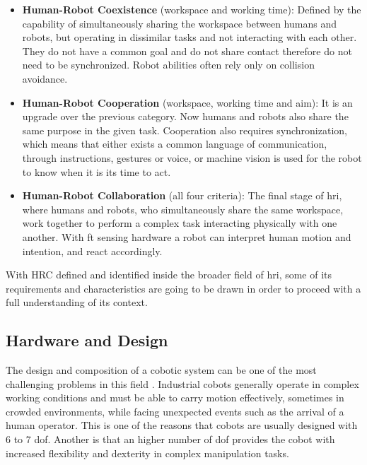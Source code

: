 \begin{itemize}
    \item \textbf{Human-Robot Coexistence} (workspace and working time): Defined by the capability of simultaneously sharing the workspace between humans and robots, but operating in dissimilar tasks and not interacting with each other. They do not have a common goal and do not share contact therefore do not need to be synchronized. Robot abilities often rely only on collision avoidance.
    \item \textbf{Human-Robot Cooperation} (workspace, working time and aim): It is an upgrade over the previous category. Now humans and robots also share the same purpose in the given task. Cooperation also requires synchronization, which means that either exists a common language of communication, through instructions, gestures or voice, or machine vision is used for the robot to know when it is its time to act.
    \item \textbf{Human-Robot Collaboration} (all four criteria): The final stage of \ac{hri}, where humans and robots, who simultaneously share the same workspace, work together to perform a complex task interacting physically with one another. With \ac{ft} sensing hardware a robot can interpret human motion and intention, and react accordingly. 
\end{itemize}


\par With HRC defined and identified inside the broader field of \ac{hri}, some of its requirements and characteristics are going to be drawn in order to proceed with a full understanding of its context.


\subsection{Hardware and Design}

\par The design and composition of a cobotic system can be one of the most challenging problems in this field \cite{handbook, cobot.design}. Industrial cobots generally operate in complex working conditions and must be able to carry motion effectively, sometimes in crowded environments, while facing unexpected events such as the arrival of a human operator. This is one of the reasons that cobots are usually designed with 6 to 7 \ac{dof}. Another is that an higher number of \ac{dof} provides the cobot with increased flexibility and dexterity in complex manipulation tasks.

